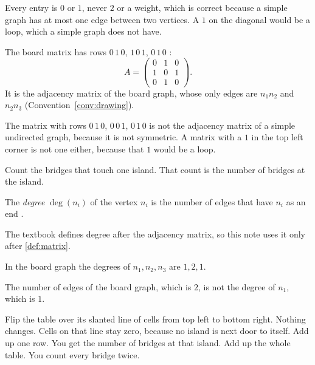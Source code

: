 \begin{remark}
Every entry is $0$ or $1$, never $2$ or a weight, which is correct because
a simple graph has at most one edge between two vertices. A $1$ on the
diagonal would be a loop, which a simple graph does not have.
\end{remark}
\begin{example}
The board matrix has rows $0\,1\,0$, $1\,0\,1$, $0\,1\,0$
\cite{whiteboard1,whiteboard2}:
\[
A=\begin{pmatrix}0&1&0\\1&0&1\\0&1&0\end{pmatrix}.
\]
It is the adjacency matrix of the board graph, whose only edges are
$n_1n_2$ and $n_2n_3$ (Convention~\ref{conv:drawing}).
\end{example}
\begin{nonexample}
The matrix with rows $0\,1\,0$, $0\,0\,1$, $0\,1\,0$ is not the adjacency
matrix of a simple undirected graph, because it is not symmetric. A matrix
with a $1$ in the top left corner is not one either, because that $1$ would
be a loop.
\end{nonexample}

\plainwords{} Count the bridges that touch one island. That count is the
number of bridges at the island.

\begin{definition}\label{def:degree}
The \emph{degree} $\deg(n_i)$ of the vertex $n_i$ is the number of edges that
have $n_i$ as an end \cite[Definition~1.2.1, p.~16]{petrosyan2015graphs}.
\end{definition}

\begin{remark}
The textbook defines degree after the adjacency matrix, so this note uses
it only after \cref{def:matrix}.
\end{remark}
\begin{example}
In the board graph the degrees of $n_1,n_2,n_3$ are $1,2,1$.
\end{example}
\begin{nonexample}
The number of edges of the board graph, which is $2$, is not the degree of
$n_1$, which is $1$.
\end{nonexample}

\plainwords{} Flip the table over its slanted line of cells from top left
to bottom right. Nothing changes. Cells on that line stay zero, because no
island is next door to itself. Add up one row. You get the number of
bridges at that island. Add up the whole table. You count every bridge
twice.

